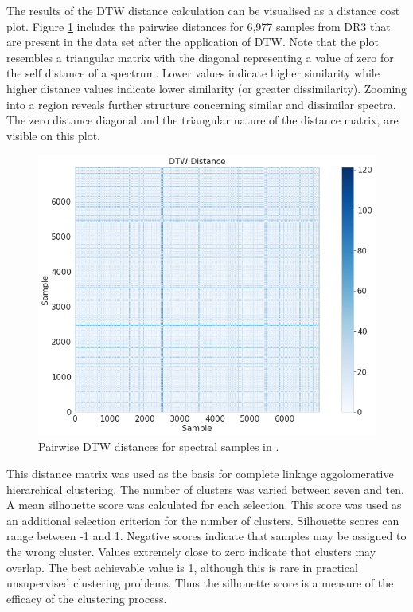 The results of the DTW distance calculation can be visualised as a distance cost plot. Figure \ref{fig4.3} includes the pairwise distances for 6,977 samples from DR3 that are present in the \citeauthor{vcotar2021galah} data set after the application of DTW. Note that the plot resembles a triangular matrix with the diagonal representing a value of zero for the self distance of a spectrum. Lower values indicate higher similarity while higher distance values indicate lower similarity (or greater dissimilarity). Zooming into a region reveals further structure concerning similar and dissimilar spectra. The zero distance diagonal and the triangular nature of the distance matrix, are visible on this plot.

\begin{figure}[!htb]
\centering
\includegraphics[scale=0.60]{figures/dtw cotar.png}
\caption{Pairwise DTW distances for spectral samples in \citet{vcotar2021galah}.}
\label{fig4.3}
\end{figure}

This distance matrix was used as the basis for complete linkage aggolomerative hierarchical clustering. The number of clusters was varied between seven and ten. A mean silhouette score was calculated for each selection. This score was used as an additional selection criterion for the number of clusters. Silhouette scores can range between -1 and 1. Negative scores indicate that samples may be assigned to the wrong cluster. Values extremely close to zero indicate that clusters may overlap. The best achievable value is 1, although this is rare in practical unsupervised clustering problems. Thus the silhouette score is a measure of the efficacy of the clustering process.

